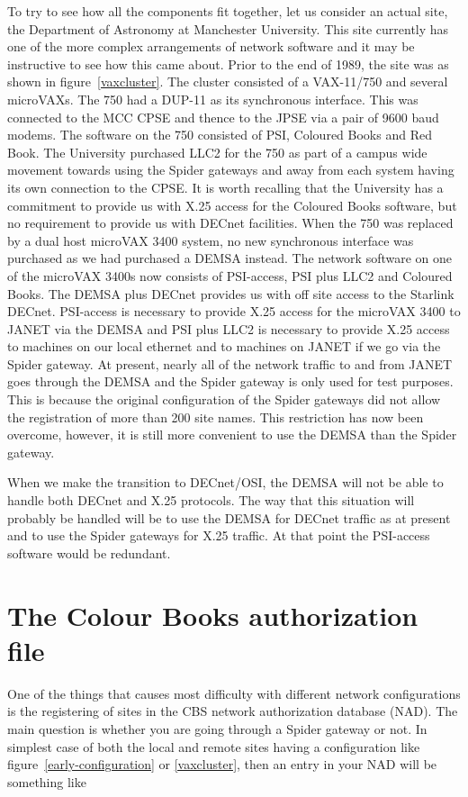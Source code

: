 To try to see how all the components fit together, let us consider an actual
site, the Department of Astronomy at Manchester University. This site currently
has one of the more complex arrangements of network software and it may be
instructive to see how this came about. Prior to the end of 1989, the site was
as shown in figure~\ref{vaxcluster}. The cluster consisted of a VAX-11/750 and
several microVAXs. The 750 had a DUP-11 as its synchronous interface. This was
connected to the MCC CPSE and thence to the JPSE via a pair of 9600 baud
modems. The software on the 750 consisted of PSI, Coloured Books and Red Book.
The University purchased LLC2 for the 750 as part of a campus wide movement
towards using the Spider gateways and away from each system having its own
connection to the CPSE. It is worth recalling that the University has a
commitment to provide us with X.25 access for the Coloured Books software, but
no requirement to provide us with DECnet facilities. When the 750 was replaced
by a dual host microVAX 3400 system, no new synchronous interface was purchased
as we had purchased a DEMSA instead. The network software on one of the
microVAX 3400s now consists of PSI-access, PSI plus LLC2 and Coloured Books.
The DEMSA plus DECnet provides us with off site access to the Starlink DECnet.
PSI-access is necessary to provide X.25 access for the microVAX 3400 to JANET
via the DEMSA and PSI plus LLC2 is necessary to provide X.25 access to machines
on our local ethernet and to machines on JANET if we go via the Spider gateway.
At present, nearly all of the network traffic to and from JANET goes through
the DEMSA and the Spider gateway is only used for test purposes. This is
because the original configuration of the Spider gateways did not allow the
registration of more than 200 site names. This restriction has now been
overcome, however, it is still more convenient to use the DEMSA than the Spider
gateway.

When we make the transition to DECnet/OSI, the DEMSA will not be able to
handle both DECnet and X.25 protocols. The way that this situation will
probably be handled will be to use the DEMSA for DECnet traffic as at present
and to use the Spider gateways for X.25 traffic. At that point the PSI-access
software would be redundant.

\section{The Colour Books authorization file}

One of the things that causes most difficulty with different network
configurations is the registering of sites in the CBS network authorization
database (NAD). The main question is whether you are going through a Spider
gateway or not. In simplest case of both the local and remote sites having a
configuration like figure~\ref{early-configuration} or \ref{vaxcluster}, then
an entry in your NAD will be something like

